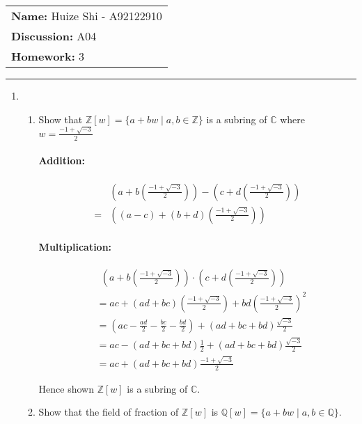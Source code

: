 \documentclass[12pt]{article}
\begin{document}
\null\hfill\begin{tabular}[t]{l@{}}
	\textbf{Name: }Huize Shi - A92122910 \\
	\textbf{Discussion: }A04 \\
	\textbf{Homework: }3
\end{tabular}
\noindent\rule{\textwidth}{0.5pt}

\begin{enumerate}
	\item
	\begin{enumerate}
		\item Show that $\mathbb{Z}[w]=\{a+bw \mid a,b \in \mathbb{Z}\}$ is a
			subring of $\mathbb{C}$ where $w = \frac{-1 + \sqrt{-3}}{2}$

			\paragraph{Addition:}
				\begin{align*}
					&\left(a+b\left(\frac{-1 + \sqrt{-3}}{2}\right)\right)-
					\left(c+d\left(\frac{-1 + \sqrt{-3}}{2}\right)\right)\\
					=& \left((a-c)+(b+d)\left(\frac{-1 + \sqrt{-3}}{2}\right)\right)
				\end{align*}
			\paragraph{Multiplication:}
				\begin{align*}
					&\ \ \left(a+b\left(\frac{-1 + \sqrt{-3}}{2}\right)\right) \cdot
						\left(c+d\left(\frac{-1 + \sqrt{-3}}{2}\right)\right)\\
					&= ac + (ad+bc)\left(\frac{-1 + \sqrt{-3}}{2}\right) +
						bd\left(\frac{-1 + \sqrt{-3}}{2}\right)^2\\
					&= (ac - \frac{ad}{2} - \frac{bc}{2} - \frac{bd}{2}) +
						(ad + bc + bd)\frac{\sqrt{-3}}{2}\\
					&= ac - (ad + bc + bd)\frac{1}{2} + (ad + bc +
						bd)\frac{\sqrt{-3}}{2}\\
					&= ac + (ad + bc +
						bd)\frac{-1 + \sqrt{-3}}{2}
				\end{align*}

				Hence shown $\mathbb{Z}[w]$ is a subring of $\mathbb{C}$.\\

		\item Show that the field of fraction of $\mathbb{Z}[w]$ is
			$\mathbb{Q}[w]=\{a+bw \mid a,b \in \mathbb{Q}\}$.

\end{enumerate}
\end{enumerate}
\end{document}
